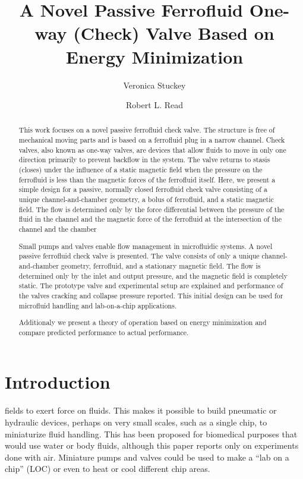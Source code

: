 \documentclass{asme2ej}
\title{A Novel Passive Ferrofluid One-way (Check) Valve Based on Energy Minimization}
\author{Veronica Stuckey
  \affiliation{
    Biomedical Engineer, University of Texas at Austin \\
    }
}
\author{Robert L. Read
\affiliation{
  Founder, Public Invention\\
    }
}
\begin{document}
\maketitle

\begin{abstract}

This work focuses on a novel passive ferrofluid check valve. The structure is free of mechanical moving parts and is based on a ferrofluid plug in a narrow channel.
Check valves, also known as one-way valves, are devices that allow fluids to move in only one direction primarily to prevent backflow in the system.
The valve returns to stasis (closes) under the influence of a static magnetic field when the pressure on the ferrofluid is less than the magnetic forces of the ferrofluid itself.
Here, we present a simple design for a passive, normally closed ferrofluid check valve consisting of a unique channel-and-chamber geometry, a bolus of ferrofluid, and a static magnetic field.
The flow is determined only by the force differential between the pressure of the fluid in the channel and the magnetic force of the ferrofluid at the intersection of the channel and the chamber

Small pumps and valves enable flow management in microfluidic systems.
A novel passive ferrofluid check valve is presented.
The valve consists of only a
unique channel-and-chamber geometry, ferrofluid, and a stationary
magnetic field.
The flow is determined only by the inlet and output pressure,
and the magnetic field is completely static.
The prototype valve and experimental setup are explained
and performance of the valves cracking and collapse pressure reported.
This initial design can be used for microfluid handling and lab-on-a-chip
applications.

Additionaly we present a theory of operation based on energy minimization
and compare predicted performance to actual performance.
\end{abstract}

\section{Introduction}


fields to exert force on fluids\cite{torres2014recent,kole2021engineering,ozbey2015modeling}.
This makes it possible to build pneumatic or hydraulic
devices, perhaps on very small scales,
such as a single chip\cite{yamahata2003ferrofluid,hatch2001ferrofluidic}, to
miniaturize fluid handling.
This has been proposed for biomedical purposes\cite{michelson2019novel}
that would use water or body fluids,
although this paper reports only on experiments done with air.
Miniature pumps and valves could be used to make a “lab on a chip” (LOC) or
even to heat or cool different chip areas.
\end{document}
